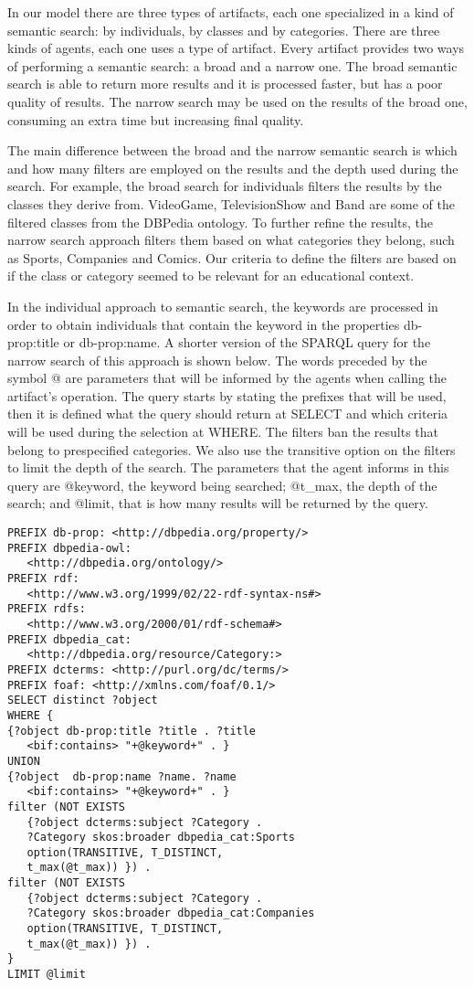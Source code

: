 \documentclass[a4paper,twoside]{article}
\begin{document}
\noindent In our model there are three types of artifacts, each one specialized in a kind of semantic search: by individuals, by classes and by categories. There are three kinds of agents, each one uses a type of artifact. Every artifact provides two ways of performing a semantic search: a broad and a narrow one. The broad semantic search is able to return more results and it is processed faster, but has a poor quality of results. The narrow search may be used on the results of the broad one, consuming an extra time but increasing final quality.

The main difference between the broad and the narrow semantic search is which and how many filters are employed on the results and the depth used during the search. For example, the broad search for individuals filters the results by the classes they derive from. VideoGame,  TelevisionShow and Band are some of the filtered classes from the DBPedia ontology. To further refine the results, the narrow search approach filters them based on what categories they belong, such as Sports, Companies and Comics. Our criteria to define the filters are based on if the class or category seemed to be relevant for an educational context.

In the individual approach to semantic search, the keywords are processed in order to obtain individuals that contain the keyword in the properties db-prop:title or db-prop:name. A shorter version of the SPARQL query for the narrow search of this approach is shown below. The words preceded by the symbol @ are parameters that will be informed by the agents when calling the artifact's operation. The query starts by stating the prefixes that will be used, then it is defined what the query should return at SELECT and which criteria will be used during the selection at WHERE. The filters ban the results that belong to prespecified categories. We also use the transitive option on the filters to limit the depth of the search. The parameters that the agent informs in this query are @keyword, the keyword being searched; @t\_max, the depth of the search; and @limit, that is how many results will be returned by the query.

\begin{small}
\begin{verbatim}
PREFIX db-prop: <http://dbpedia.org/property/>
PREFIX dbpedia-owl:
   <http://dbpedia.org/ontology/>
PREFIX rdf:
   <http://www.w3.org/1999/02/22-rdf-syntax-ns#>
PREFIX rdfs:
   <http://www.w3.org/2000/01/rdf-schema#>
PREFIX dbpedia_cat:
   <http://dbpedia.org/resource/Category:>
PREFIX dcterms: <http://purl.org/dc/terms/>
PREFIX foaf: <http://xmlns.com/foaf/0.1/>
SELECT distinct ?object
WHERE {
{?object db-prop:title ?title . ?title
   <bif:contains> "+@keyword+" . }
UNION 
{?object  db-prop:name ?name. ?name
   <bif:contains> "+@keyword+" . }
filter (NOT EXISTS
   {?object dcterms:subject ?Category .
   ?Category skos:broader dbpedia_cat:Sports
   option(TRANSITIVE, T_DISTINCT,
   t_max(@t_max)) }) .
filter (NOT EXISTS
   {?object dcterms:subject ?Category .
   ?Category skos:broader dbpedia_cat:Companies
   option(TRANSITIVE, T_DISTINCT,
   t_max(@t_max)) }) .
}
LIMIT @limit
\end{verbatim}
\end{small}
\end{document}
